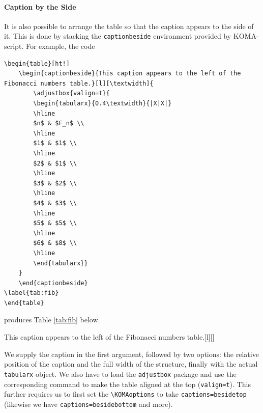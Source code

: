 \paragraph{Caption by the Side} It is also possible to arrange the table so that the caption appears to the side of it. This is done by stacking the \verb|captionbeside| environment provided by KOMA-script. For example, the code
\begin{lstlisting}
\begin{table}[ht!]
    \begin{captionbeside}{This caption appears to the left of the Fibonacci numbers table.}[l][\textwidth]{
        \adjustbox{valign=t}{
        \begin{tabularx}{0.4\textwidth}{|X|X|}
        \hline
        $n$ & $F_n$ \\
        \hline 
        $1$ & $1$ \\
        \hline 
        $2$ & $1$ \\
        \hline 
        $3$ & $2$ \\
        \hline 
        $4$ & $3$ \\
        \hline
        $5$ & $5$ \\
        \hline
        $6$ & $8$ \\
        \hline
        \end{tabularx}}
    }
    \end{captionbeside}
\label{tab:fib}
\end{table}    
\end{lstlisting}
produces Table \ref{tab:fib} below.

\begin{table}[ht!]
\begin{captionbeside}{This caption appears to the left of the Fibonacci numbers table.}[l][\textwidth]{}
\end{captionbeside}
\label{tab:fib}
\end{table}
We supply the caption in the first argument, followed by two options: the relative position of the caption and the full width of the structure, finally with the actual \verb|tabularx| object. We also have to load the \verb|adjustbox| package and use the corresponding command to make the table aligned at the top (\verb|valign=t|). This further requires us to first set the \texttt{\textbackslash KOMAoptions} to take \verb|captions=besidetop| (likewise we have \verb|captions=besidebottom| and more).

